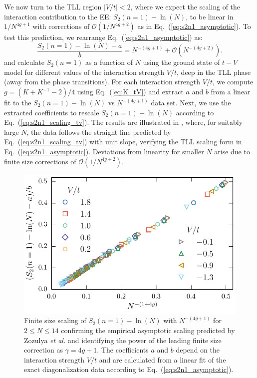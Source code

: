 We now turn to the  TLL region $|V/t| < 2$, where we expect the scaling of the interaction
contribution to the EE: $S_2(n=1)-\ln(N)$, to be linear in $1/N^{4g+1}$ with
corrections of $\mathcal{O}(1/N^{4g+2})$ as in Eq.~(\ref{eq:s2n1_asymptotic}).
To test this prediction, we rearrange Eq.~(\ref{eq:s2n1_asymptotic}) as:
%
\begin{equation}
\frac{S_2(n=1)-\ln(N)-a}{b}=N^{-(4g+1)}+\mathcal{O}\left(N^{-(4g+2)}\right).\label{eq:s2n1_scaling_tv}
\end{equation}
%
and calculate $S_2(n=1)$ as a function of $N$ using the ground state of $t-V$
model for different values of the interaction strength $V/t$, deep in the TLL
phase (away from the phase transitions). For each interaction strength $V/t$, we
compute $g=(K+K^{-1}-2)/4$ using Eq.~(\ref{eq:K_tV}) and extract $a$ and $b$
from a linear fit to the $S_2(n=1)-\ln(N)$ vs $ N^{-(4g+1)}$ data set.
Next, we use the extracted coefficients to rescale $S_2(n=1)-\ln(N)$ according
to Eq.~(\ref{eq:s2n1_scaling_tv}). The results are illustrated in
, where, for suitably large $N$, the data follows the straight line
predicted by Eq.~(\ref{eq:s2n1_scaling_tv}) with unit slope, verifying the TLL
scaling form in Eq.~(\ref{eq:s2n1_asymptotic}). Deviations from linearity 
for smaller $N$ arise due to finite size corrections of $\mathcal{O}(1/N^{4g+2})$.
%
\begin{figure}[h]
\begin{center}
\includegraphics[width=0.7\columnwidth]{Chapters/Scaling_of_PPE_In_TLL_phase.pdf}
\end{center}
\caption{Finite size scaling of $S_2(n=1)-\ln(N)$ with $N^{-(4g+1)}$
for $2 \leq N \leq 14$ confirming the empirical asymptotic scaling predicted by
Zozulya \emph{et al.} \cite{Zozulya:2007jw} and identifying the power of the
leading finite size correction as $\gamma = 4g + 1$.  The coefficients $a$ and
$b$ depend on the interaction strength $V/t$ and are calculated from a linear
fit of the exact diagonalization data according to Eq.~(\ref{eq:s2n1_asymptotic}).} 
\label{fig:Scaling_of_PPE_In_TLL_phase}
\end{figure}
%

